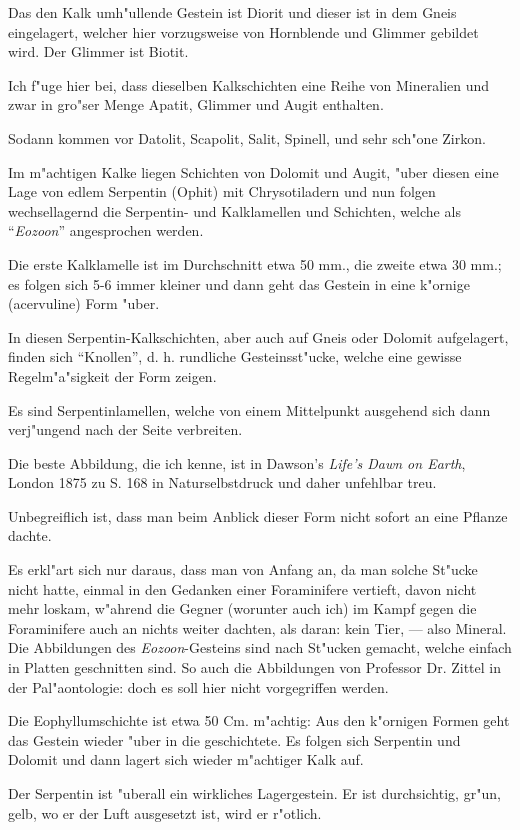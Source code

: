 \documentclass[a4paper, 11pt, oneside, german]{article}
\begin{document}
Das den Kalk umh"ullende Gestein ist Diorit und dieser ist in dem Gneis eingelagert, welcher hier vorzugsweise von Hornblende und Glimmer gebildet wird. Der Glimmer ist Biotit.

Ich f"uge hier bei, dass dieselben Kalkschichten eine Reihe von Mineralien und zwar in gro"ser Menge Apatit, Glimmer und Augit enthalten.

Sodann kommen vor Datolit, Scapolit, Salit, Spinell, und sehr sch"one Zirkon.

Im m"achtigen Kalke liegen Schichten von Dolomit und Augit, "uber diesen eine Lage von edlem Serpentin (Ophit) mit Chrysotiladern und nun folgen wechsellagernd die Serpentin- und Kalklamellen und Schichten, welche als "`\emph{Eozoon}"' angesprochen werden.

Die erste Kalklamelle ist im Durchschnitt etwa 50 mm., die zweite etwa 30 mm.; es folgen sich 5-6 immer kleiner und dann geht das Gestein in eine k"ornige (acervuline) Form "uber.

In diesen Serpentin-Kalkschichten, aber auch auf Gneis oder Dolomit aufgelagert, finden sich "`Knollen"', d. h. rundliche Gesteinsst"ucke, welche eine gewisse Regelm"a"sigkeit der Form zeigen.

Es sind Serpentinlamellen, welche von einem Mittelpunkt ausgehend sich dann verj"ungend nach der Seite verbreiten.

Die beste Abbildung, die ich kenne, ist in Dawson's \emph{Life's Dawn on Earth}, London 1875 zu S. 168 in Naturselbstdruck und daher unfehlbar treu.

Unbegreiflich ist, dass man beim Anblick dieser Form nicht sofort an eine Pflanze dachte.

Es erkl"art sich nur daraus, dass man von Anfang an, da man solche St"ucke nicht hatte, einmal in den Gedanken einer Foraminifere vertieft, davon nicht mehr loskam, w"ahrend die Gegner (worunter auch ich) im Kampf gegen die Foraminifere auch an nichts weiter dachten, als daran: kein Tier, --- also Mineral. Die Abbildungen des \emph{Eozoon}-Gesteins sind nach St"ucken gemacht, welche einfach in Platten geschnitten sind. So auch die Abbildungen von Professor Dr. Zittel in der Pal"aontologie: doch es soll hier nicht vorgegriffen werden.

Die Eophyllumschichte ist etwa 50 Cm. m"achtig: Aus den k"ornigen Formen geht das Gestein wieder "uber in die geschichtete. Es folgen sich Serpentin und Dolomit und dann lagert sich wieder m"achtiger Kalk auf.

Der Serpentin ist "uberall ein wirkliches Lagergestein. Er ist durchsichtig, gr"un, gelb, wo er der Luft ausgesetzt ist, wird er r"otlich.
\end{document}
